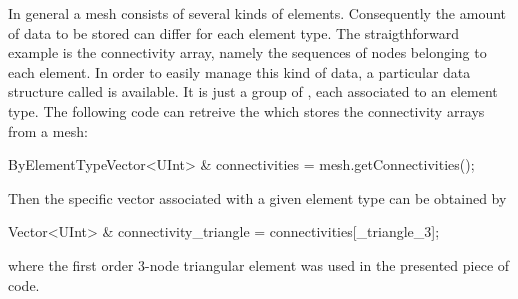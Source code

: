 In general a mesh consists of several kinds of elements. Consequently the 
amount of data to be stored can differ for each element type. The straigthforward 
example is the connectivity array, namely the sequences of nodes belonging to
each element. In order to easily manage this kind of data, a
particular data structure called  is available. 
It is just a group of , each associated to an element
type. The following code can retreive the 
which stores the connectivity arrays from a mesh:
\begin{cpp}
  ByElementTypeVector<UInt> & connectivities = mesh.getConnectivities();
\end{cpp}
Then the specific vector associated with a given element type can be 
obtained by
\begin{cpp}
  Vector<UInt> & connectivity_triangle = connectivities[_triangle_3];
\end{cpp}
where the first order 3-node triangular element was used in the presented 
piece of code.



